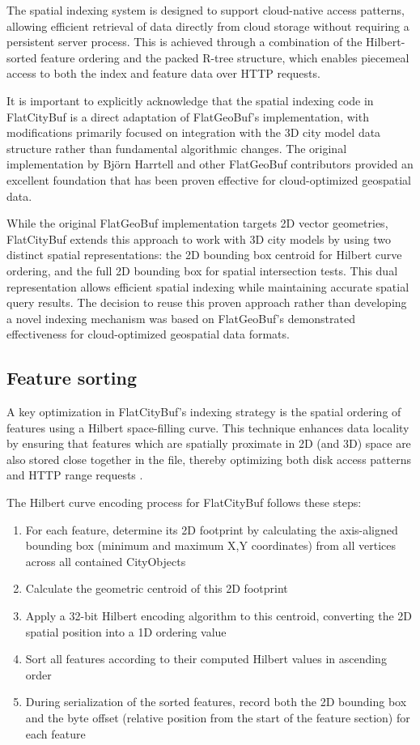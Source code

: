 The spatial indexing system is designed to support cloud-native access patterns, allowing efficient retrieval of data directly from cloud storage without requiring a persistent server process. This is achieved through a combination of the Hilbert-sorted feature ordering and the packed R-tree structure, which enables piecemeal access to both the index and feature data over HTTP requests.

It is important to explicitly acknowledge that the spatial indexing code in FlatCityBuf is a direct adaptation of FlatGeoBuf's implementation, with modifications primarily focused on integration with the 3D city model data structure rather than fundamental algorithmic changes. The original implementation by Björn Harrtell and other FlatGeoBuf contributors \citep{flatgeobuf} provided an excellent foundation that has been proven effective for cloud-optimized geospatial data.

While the original FlatGeoBuf implementation targets 2D vector geometries, FlatCityBuf extends this approach to work with 3D city models by using two distinct spatial representations: the 2D bounding box centroid for Hilbert curve ordering, and the full 2D bounding box for spatial intersection tests. This dual representation allows efficient spatial indexing while maintaining accurate spatial query results. The decision to reuse this proven approach rather than developing a novel indexing mechanism was based on FlatGeoBuf's demonstrated effectiveness for cloud-optimized geospatial data formats.

\subsection{Feature sorting}
\label{methodology:spatial_index:feature_sorting}
A key optimization in FlatCityBuf's indexing strategy is the spatial ordering of features using a Hilbert space-filling curve. This technique enhances data locality by ensuring that features which are spatially proximate in 2D (and 3D) space are also stored close together in the file, thereby optimizing both disk access patterns and HTTP range requests \citep{horance_2022_detail}.

The Hilbert curve encoding process for FlatCityBuf follows these steps:

\begin{enumerate}
  \item For each feature, determine its 2D footprint by calculating the axis-aligned bounding box (minimum and maximum X,Y coordinates) from all vertices across all contained CityObjects
  \item Calculate the geometric centroid of this 2D footprint
  \item Apply a 32-bit Hilbert encoding algorithm to this centroid, converting the 2D spatial position into a 1D ordering value
  \item Sort all features according to their computed Hilbert values in ascending order
  \item During serialization of the sorted features, record both the 2D bounding box and the byte offset (relative position from the start of the feature section) for each feature
\end{enumerate}

